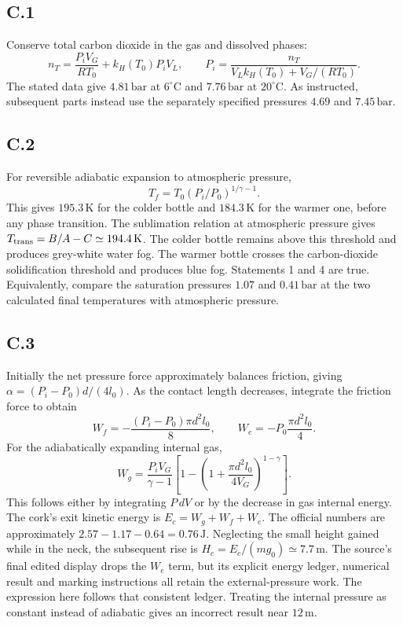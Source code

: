 \documentclass{article}
\begin{document}
\subsection*{C.1}
Conserve total carbon dioxide in the gas and dissolved phases:
\[n_T=\frac{P_iV_G}{RT_0}+k_H(T_0)P_iV_L,\qquad P_i=\frac{n_T}{V_Lk_H(T_0)+V_G/(RT_0)}.\]
The stated data give $4.81\,\mathrm{bar}$ at $6^\circ\mathrm C$ and $7.76\,\mathrm{bar}$ at $20^\circ\mathrm C$. As instructed, subsequent parts instead use the separately specified pressures $4.69$ and $7.45\,\mathrm{bar}$.
\subsection*{C.2}
For reversible adiabatic expansion to atmospheric pressure,
\[T_f=T_0(P_i/P_0)^{1/\gamma-1}.\]
This gives $195.3\,\mathrm K$ for the colder bottle and $184.3\,\mathrm K$ for the warmer one, before any phase transition. The sublimation relation at atmospheric pressure gives $T_{\rm trans}=B/A-C\simeq194.4\,\mathrm K$. The colder bottle remains above this threshold and produces grey-white water fog. The warmer bottle crosses the carbon-dioxide solidification threshold and produces blue fog. Statements 1 and 4 are true. Equivalently, compare the saturation pressures $1.07$ and $0.41\,\mathrm{bar}$ at the two calculated final temperatures with atmospheric pressure.
\subsection*{C.3}
Initially the net pressure force approximately balances friction, giving $\alpha=(P_i-P_0)d/(4l_0)$. As the contact length decreases, integrate the friction force to obtain
\[W_f=-\frac{(P_i-P_0)\pi d^2l_0}{8},\qquad W_e=-P_0\frac{\pi d^2l_0}{4}.\]
For the adiabatically expanding internal gas,
\[W_g=\frac{P_iV_G}{\gamma-1}\left[1-\left(1+\frac{\pi d^2l_0}{4V_G}\right)^{1-\gamma}\right].\]
This follows either by integrating $P\,dV$ or by the decrease in gas internal energy. The cork's exit kinetic energy is $E_c=W_g+W_f+W_e$. The official numbers are approximately $2.57-1.17-0.64=0.76\,\mathrm J$. Neglecting the small height gained while in the neck, the subsequent rise is $H_c=E_c/(mg_0)\simeq7.7\,\mathrm m$.
The source's final edited display drops the $W_e$ term, but its explicit energy ledger, numerical result and marking instructions all retain the external-pressure work. The expression here follows that consistent ledger. Treating the internal pressure as constant instead of adiabatic gives an incorrect result near $12\,\mathrm m$.
\end{document}
